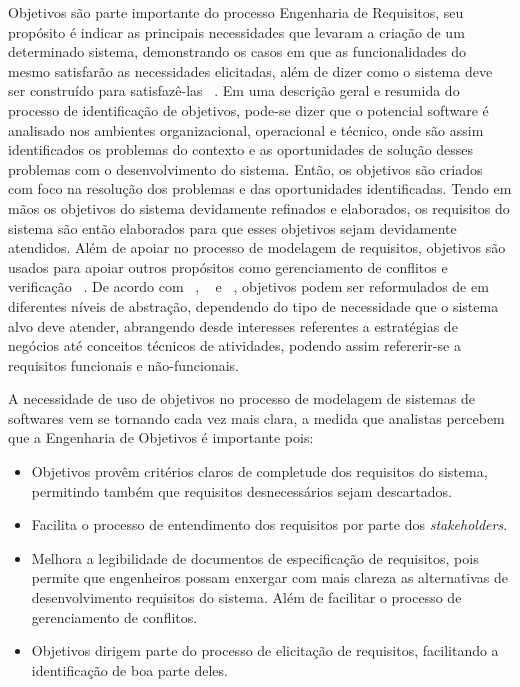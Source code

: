 
Objetivos são parte importante do processo Engenharia de Requisitos, seu propósito é indicar as principais necessidades que levaram a criação de um determinado sistema, demonstrando os casos em que as funcionalidades do mesmo satisfarão as necessidades elicitadas, além de dizer como o sistema deve ser construído para satisfazê-las ~\cite{ross1977structured}. Em uma descrição geral e resumida do processo de identificação de objetivos, pode-se dizer que o potencial software é analisado nos ambientes organizacional, operacional e técnico, onde são assim identificados os problemas do contexto e as oportunidades de solução desses problemas com o desenvolvimento do sistema. Então, os objetivos são criados com foco na resolução dos problemas e das oportunidades identificadas. Tendo em mãos os objetivos do sistema devidamente refinados e elaborados, os requisitos do sistema são então elaborados para que esses objetivos sejam devidamente atendidos. Além de apoiar no processo de modelagem de requisitos, objetivos são usados para apoiar outros propósitos como gerenciamento de conflitos e verificação ~\cite{van2001goal}. De acordo com ~\cite{van2001goal}, ~\cite{jackson1995software} e ~\cite{zave1997four}, objetivos podem ser reformulados de em diferentes níveis de abstração, dependendo do tipo de necessidade que o sistema alvo deve atender, abrangendo desde interesses referentes a estratégias de negócios até conceitos técnicos de atividades, podendo assim refererir-se a requisitos funcionais e não-funcionais.

A necessidade de uso de objetivos no processo de modelagem de sistemas de softwares vem se tornando cada vez mais clara, a medida que analistas percebem que a Engenharia de Objetivos é importante pois:
\begin{itemize}
	\item Objetivos provêm critérios claros de completude dos requisitos do sistema, permitindo também que requisitos desnecessários sejam descartados.
	\item Facilita o processo de entendimento dos requisitos por parte dos \textit{stakeholders}.
	\item Melhora a legibilidade de documentos de especificação de requisitos, pois permite que engenheiros possam enxergar com mais clareza as alternativas de desenvolvimento requisitos do sistema. Além de facilitar o processo de gerenciamento de conflitos.
	\item Objetivos dirigem parte do processo de elicitação de requisitos, facilitando a identificação de boa parte deles.
	
\end{itemize}

